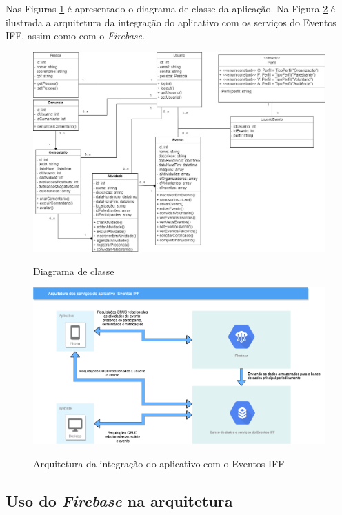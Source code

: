 Nas Figuras \ref{fig:classe} é apresentado o diagrama de classe da aplicação. Na Figura \ref{fig:arquitetura} é ilustrada a arquitetura da integração do aplicativo com os serviços do Eventos IFF, assim como com o \textit{Firebase}.

\begin{figure}[H]
    \centering
    \caption{Diagrama de classe}
    \includegraphics[scale=0.4]{figuras/Diagrama-de-classe.jpg}
    \label{fig:classe}
\end{figure}

\begin{figure}[H]
    \centering
    \caption{Arquitetura da integração do aplicativo com o Eventos IFF}
    \includegraphics[scale=0.475]{figuras/Arquitetura.png}
    \label{fig:arquitetura}
\end{figure}

\subsection{Uso do \textit{Firebase} na arquitetura}

